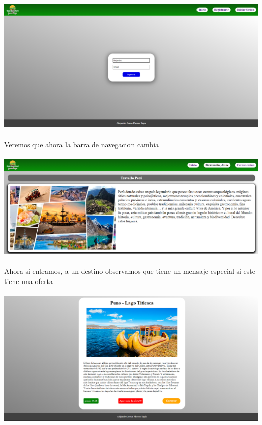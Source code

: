 \documentclass{article}
\begin{document}
            \includegraphics[width=16cm]{img/LOGIN.png}
            \\ \\
            Veremos que ahora la barra de navegacion cambia
            \\ \\
            \includegraphics[width=16cm]{img/BARRA.png}
            \\ \\
            Ahora si entramos, a un destino observamos que tiene un mensaje especial si este tiene una oferta
            \\ \\
            \includegraphics[width=16cm]{img/DESTINO.png}
            \\ \\
\end{document}
